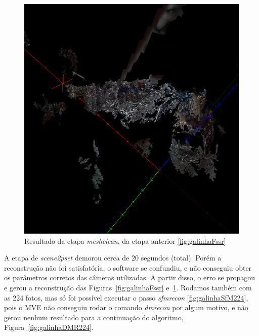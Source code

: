 \begin{figure}[!h]
	\centering
	\includegraphics[width=0.7\linewidth]{figs/galinhameshclean.png}
	\caption{%
	Resultado da etapa \emph{meshclean}, da etapa anterior \ref{fig:galinhaFssr}
	}\label{fig:galinhaMeshClean}
\end{figure}

A etapa de \emph{scene2pset} demorou cerca de 20 segundos (total). Porém
a reconstrução não foi satisfatória, o software se confundiu, e
não conseguiu obter os parâmetros corretos das câmeras utilizadas. A partir
disso, o erro se propagou e gerou a reconstrução das Figuras~\ref{fig:galinhaFssr}
e~\ref{fig:galinhaMeshClean}.  Rodamos também com as 224 fotos, mas só foi possível
executar o passo \emph{sfmrecon} \ref{fig:galinhaSfM224}, pois o MVE não
conseguiu rodar o comando \emph{dmrecon} por algum motivo, e não gerou nenhum
resultado para a continuação do algoritmo, Figura~\ref{fig:galinhaDMR224}.



